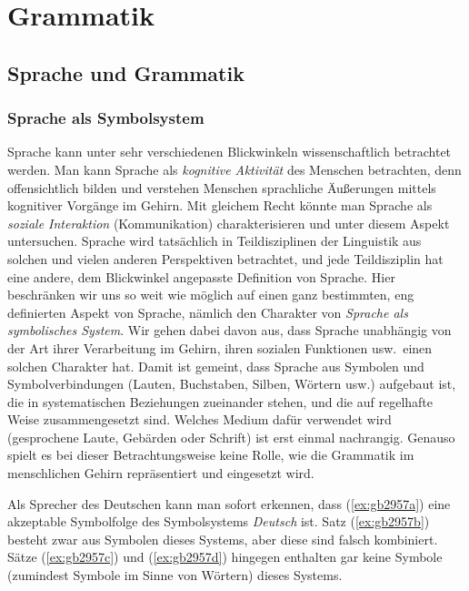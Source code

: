\chapter{Grammatik}

\label{sec:grammatik}

\section{Sprache und Grammatik}

\label{sec:spracheundgrammatik}

\subsection{Sprache als Symbolsystem}

\label{sec:sprachealssymbolsystem}


Sprache kann unter sehr verschiedenen Blickwinkeln wissenschaftlich betrachtet werden.
Man kann Sprache als \textit{kognitive Aktivität} des Menschen betrachten, denn offensichtlich bilden und verstehen Menschen sprachliche Äußerungen mittels kognitiver Vorgänge im Gehirn.
Mit gleichem Recht könnte man Sprache als \textit{soziale Interaktion} (Kommunikation) charakterisieren und unter diesem Aspekt untersuchen.
Sprache wird tatsächlich in Teildisziplinen der Linguistik aus solchen und vielen anderen Perspektiven betrachtet, und jede Teildisziplin hat eine andere, dem Blickwinkel angepasste Definition von Sprache.
Hier beschränken wir uns so weit wie möglich auf einen ganz bestimmten, eng definierten Aspekt von Sprache, nämlich den Charakter von \textit{Sprache als symbolisches System}.
Wir gehen dabei davon aus, dass Sprache unabhängig von der Art ihrer Verarbeitung im Gehirn, ihren sozialen Funktionen usw.\ einen solchen Charakter hat.
Damit ist gemeint, dass Sprache aus Symbolen und Symbolverbindungen (Lauten, Buchstaben, Silben, Wörtern usw.) aufgebaut ist, die in systematischen Beziehungen zueinander stehen, und die auf regelhafte Weise zusammengesetzt sind.
Welches Medium dafür verwendet wird (\zB gesprochene Laute, Gebärden oder Schrift) ist erst einmal nachrangig.
Genauso spielt es bei dieser Betrachtungsweise keine Rolle, wie die Grammatik im menschlichen Gehirn repräsentiert und eingesetzt wird.

Als Sprecher des Deutschen kann man \zB sofort erkennen, dass (\ref{ex:gb2957a}) eine akzeptable Symbolfolge des Symbolsystems \textit{Deutsch} ist.
Satz (\ref{ex:gb2957b}) besteht zwar aus Symbolen dieses Systems, aber diese sind falsch kombiniert.
Sätze (\ref{ex:gb2957c}) und (\ref{ex:gb2957d}) hingegen enthalten gar keine Symbole (zumindest Symbole im Sinne von Wörtern) dieses Systems.

